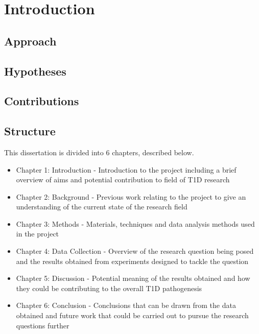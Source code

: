 
\chapter{Introduction}
\label{sec:introduction}


\section{Approach}


\section{Hypotheses}
\section{Contributions}

\section{Structure}
This dissertation is divided into 6 chapters, described below.
\begin{itemize}
\item Chapter 1: Introduction - Introduction to the project including a brief overview of aims and potential contribution to field of T1D research 
\item Chapter 2: Background - Previous work relating to the project to give an understanding of the current state of the research field
\item Chapter 3: Methods - Materials, techniques and data analysis methods used in the project
\item Chapter 4: Data Collection - Overview of the research question being posed and the results obtained from experiments designed to tackle the question
\item Chapter 5: Discussion - Potential meaning of the results obtained and how they could be contributing to the overall T1D pathogenesis
\item Chapter 6: Conclusion - Conclusions that can be drawn from the data obtained and future work that could be carried out to pursue the research questions further
\end{itemize}
